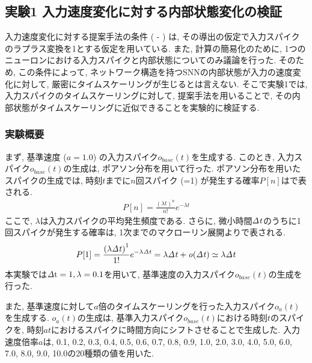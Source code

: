 \subsection{実験1 入力速度変化に対する内部状態変化の検証}

入力速度変化に対する提案手法の条件 ( - ) は, その導出の仮定で入力スパイクのラプラス変換を1とする仮定を用いている.
また, 計算の簡易化のために, 1つのニューロンにおける入力スパイクと内部状態についてのみ議論を行った.
そのため, この条件によって, ネットワーク構造を持つSNNの内部状態が入力の速度変化に対して, 厳密にタイムスケーリングが生じるとは言えない.
そこで実験1では, 入力スパイクのタイムスケーリングに対して, 提案手法を用いることで, その内部状態がタイムスケーリングに近似できることを実験的に検証する.


\subsubsection{実験概要}
まず, 基準速度 ($a=1.0$) の入力スパイク$o_{base}(t)$を生成する.
このとき, 入力スパイク$o_{base}(t)$の生成は, ポアソン分布を用いて行った.
ポアソン分布を用いたスパイクの生成\cite{poisson}では, 時刻$t$までに$n$回スパイク (=1) が発生する確率$P[n]$はで表される.
\begin{align}
    P[n] = \frac{\left(\lambda t\right)^n}{n!} e^{-\lambda t} \label{eq:poisson:distribution}
\end{align}
ここで, $\lambda$は入力スパイクの平均発生頻度である.
さらに, 微小時間$\it{\Delta} t$のうちに1回スパイクが発生する確率は, 1次までのマクローリン展開よりで表される.
\begin{align}
    P[1] = \frac{\left(\lambda \it{\Delta} t\right)^1}{1!} e^{-\lambda \it{\Delta} t} = \lambda \it{\Delta} t + o(\it{\Delta} t) \simeq \lambda \it{\Delta} t \label{eq:poisson:distribution:approximation}
\end{align}
本実験では$\it{\Delta} \mathrm{ t = 1, \lambda=0.1}$を用いて, 基準速度の入力スパイク$o_{base}(t)$の生成を行った.

また, 基準速度に対して$a$倍のタイムスケーリングを行った入力スパイク$o_a(t)$を生成する.
$o_a(t)$の生成は, 基準入力スパイク$o_{base}(t)$における時刻$t$のスパイクを, 時刻$at$におけるスパイクに時間方向にシフトさせることで生成した.
入力速度倍率$a$は, 0.1, 0.2, 0.3, 0.4, 0.5, 0.6, 0.7, 0.8, 0.9, 1.0, 2.0, 3.0, 4.0, 5.0, 6.0, 7.0, 8.0, 9.0, 10.0の20種類の値を用いた.

